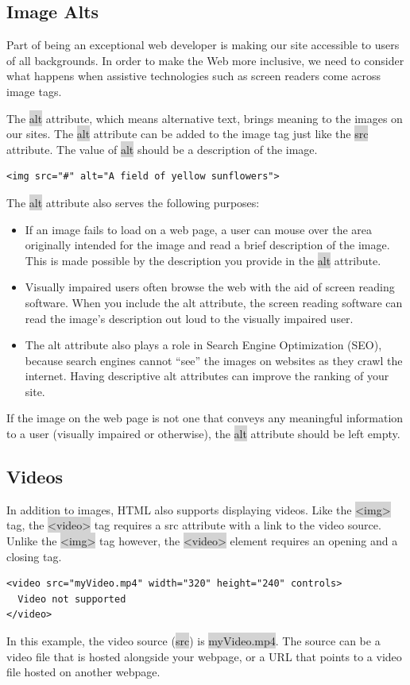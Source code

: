 \documentclass[11pt]{article}
\begin{document}
\subsection{Image Alts}
Part of being an exceptional web developer is making our site accessible to users of all backgrounds. In order to make the Web more inclusive, we need to consider what happens when assistive technologies such as screen readers come across image tags.

The \colorbox{lightgray}{alt} attribute, which means alternative text, brings meaning to the images on our sites. The \colorbox{lightgray}{alt} attribute can be added to the image tag just like the \colorbox{lightgray}{src} attribute. The value of \colorbox{lightgray}{alt} should be a description of the image.
\begin{lstlisting}
<img src="#" alt="A field of yellow sunflowers">
\end{lstlisting}
The \colorbox{lightgray}{alt} attribute also serves the following purposes:
\begin{itemize}[leftmargin = *]
\item If an image fails to load on a web page, a user can mouse over the area originally intended for the image and read a brief description of the image. This is made possible by the description you provide in the \colorbox{lightgray}{alt} attribute.
\item Visually impaired users often browse the web with the aid of screen reading software. When you include the alt attribute, the screen reading software can read the image’s description out loud to the visually impaired user.
\item The alt attribute also plays a role in Search Engine Optimization (SEO), because search engines cannot “see” the images on websites as they crawl the internet. Having descriptive alt attributes can improve the ranking of your site.
\end{itemize}
If the image on the web page is not one that conveys any meaningful information to a user (visually impaired or otherwise), the \colorbox{lightgray}{alt} attribute should be left empty.

\subsection{Videos}
In addition to images, HTML also supports displaying videos. Like the \colorbox{lightgray}{<img>} tag, the \colorbox{lightgray}{<video>} tag requires a src attribute with a link to the video source. Unlike the \colorbox{lightgray}{<img>} tag however, the \colorbox{lightgray}{<video>} element requires an opening and a closing tag.
\begin{lstlisting}
<video src="myVideo.mp4" width="320" height="240" controls>
  Video not supported
</video>
\end{lstlisting}
In this example, the video source (\colorbox{lightgray}{src}) is \colorbox{lightgray}{myVideo.mp4}. The source can be a video file that is hosted alongside your webpage, or a URL that points to a video file hosted on another webpage.
\end{document}
